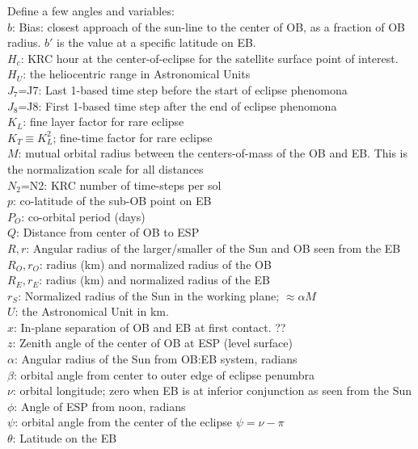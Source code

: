 \documentclass{article}
\begin{document}
Define a few angles and variables:
\\ $b$: Bias: closest approach of the sun-line to the center of OB, as a fraction of OB radius.
\qi $b'$ is the value at a specific latitude on EB.
\\ $H_c$: KRC hour at the center-of-eclipse for the satellite surface point of interest. 
\\ $H_U$:  the heliocentric range in Astronomical Units
\\ $J_7 $=J7: Last 1-based time step before the start of eclipse phenomona
\\ $J_8$=J8: First 1-based time step after the end of eclipse phenomona 
\\ $K_L$: fine layer factor for rare eclipse
\\ $K_T \equiv K_L^2$; fine-time factor for rare eclipse
\\ $M$: mutual orbital radius between the centers-of-mass of the OB and EB. 
\qi This is the normalization scale for all distances
\\ $N_2$=N2: KRC number of time-steps per sol
\\ $p$: co-latitude of the sub-OB point on EB
\\ $P_O$: co-orbital period (days) 
\\ $Q$: Distance from center of OB to ESP
\\ $R,r$: Angular radius of the larger/smaller of the Sun and OB seen from the EB
\\ $R_O, r_O$: radius (km) and normalized radius of the OB 
\\ $R_E, r_E $: radius (km) and normalized radius of the EB
\\ $r_S$: Normalized radius of the Sun in the working plane; $\approx \alpha M$
\\ $U$: the Astronomical Unit in km.
\\ $x$: In-plane separation of OB and EB at first contact. ??
\\ $z$: Zenith angle of the center of OB at ESP (level surface)
\\ $ \alpha $: Angular radius of the Sun from OB:EB system, radians 
\\ $\beta$: orbital angle from center to outer edge of eclipse penumbra
\\ $\nu$: orbital longitude; zero when EB is at inferior conjunction as seen from the Sun 
\\ $ \phi $: Angle of ESP from noon, radians
\\ $ \psi$: orbital angle from the center of the eclipse $\psi=\nu -\pi$
\\ $\theta$: Latitude on the EB
\end{document}
